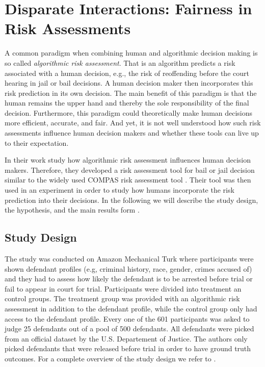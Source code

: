 \documentclass[11pt,a4paper,final]{article}
\begin{document}
\section{Disparate Interactions: Fairness in Risk Assessments}
\label{sec:paper1}
A common paradigm when combining human and algorithmic decision making is so called \emph{algorithmic risk assessment}. That is an algorithm predicts a risk associated with a human decision, e.g., the risk of reoffending before the court hearing in jail or bail decisions. A human decision maker then incorporates this risk prediction in its own decision. The main benefit of this paradigm is that the human remains the upper hand and thereby the sole responsibility of the final decision. Furthermore, this paradigm could theoretically make human decisions more efficient, accurate, and fair. And yet, it is not well understood how such risk assessments influence human decision makers and whether these tools can live up to their expectation.  

In their work \citet{green2019disparate} study how algorithmic risk assessment influences human decision makers. Therefore, they developed a risk assessment tool for bail or jail decision similar to the widely used COMPAS risk assessment tool \cite[c.f.,][]{brennan2009evaluating}. Their tool was then used in an experiment in order to study how humans incorporate the risk prediction into their decisions. In the following we will describe the study design, the hypothesis, and the main results form \citet{green2019disparate}. 

\subsection{Study Design}
The study was conducted on Amazon Mechanical Turk where participants were shown defendant profiles (e.g, criminal history, race, gender, crimes accused of) and they had to assess how likely the defendant is to be arrested before trial or fail to appear in court for trial. Participants were divided into treatment an control groups. The treatment group was provided with an algorithmic risk assessment in addition to the defendant profile, while the control group only had access to the defendant profile. Every one of the 601 participants was asked to judge 25 defendants out of a pool of 500 defendants. All defendants were picked from an official dataset by the U.S. Departement of Justice. The authors only picked defendants that were released before trial in order to have ground truth outcomes. For a complete overview of the study design we refer to \citet{green2019disparate}.
\end{document}
